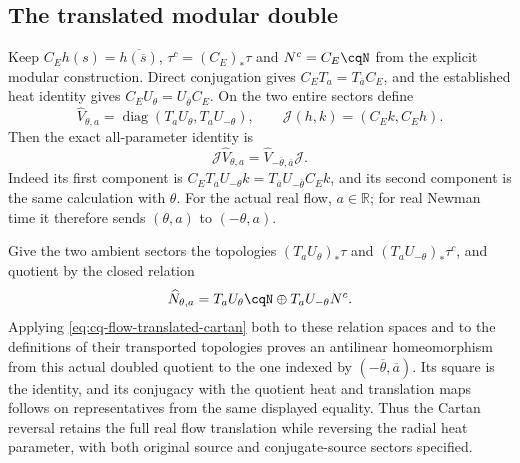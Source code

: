 \subsection{The translated modular double}

Keep $C_Eh(s)=\overline{h(\overline s)}$,
$\tau^c=(C_E)_*\tau$ and $N^c=C_E\cqN$ from the explicit modular
construction. Direct conjugation gives
$C_ET_a=T_{\overline a}C_E$, and the established heat identity gives
$C_EU_\theta=U_{\overline\theta}C_E$.
On the two entire sectors define
\[
 \widehat V_{\theta,a}
   =\operatorname{diag}(T_aU_\theta,T_aU_{-\theta}),\qquad
 \mathcal J(h,k)=(C_Ek,C_Eh).
\]
Then the exact all-parameter identity is
\begin{equation}
 \mathcal J\widehat V_{\theta,a}
 =\widehat V_{-\overline\theta,\overline a}\mathcal J .
 \label{eq:cq-flow-translated-cartan}
\end{equation}
Indeed its first component is
$C_ET_aU_{-\theta}k=T_{\overline a}U_{-\overline\theta}C_Ek$,
and its second component is the same calculation with $\theta$.
For the actual real flow, $a\in\mathbb R$; for real Newman time it
therefore sends $(\theta,a)$ to $(-\theta,a)$.

Give the two ambient sectors the topologies
$(T_aU_\theta)_*\tau$ and $(T_aU_{-\theta})_*\tau^c$, and quotient
by the closed relation
\[
 \widehat N_{\theta,a}
   =T_aU_\theta\cqN\oplus T_aU_{-\theta}N^c .
\]
Applying \eqref{eq:cq-flow-translated-cartan} both to these relation
spaces and to the definitions of their transported topologies proves
an antilinear homeomorphism from this actual doubled quotient to
the one indexed by $(-\overline\theta,\overline a)$.
Its square is the identity, and its conjugacy with the quotient heat
and translation maps follows on representatives from the same
displayed equality. Thus the Cartan reversal retains the full real
flow translation while reversing the radial heat parameter, with
both original source and conjugate-source sectors specified.
